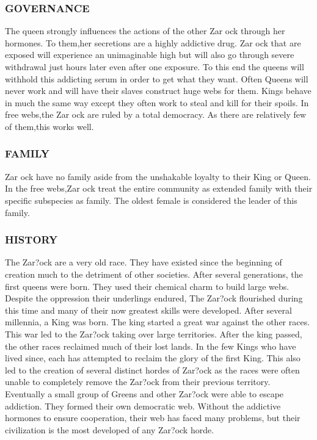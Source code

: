 \subsubsection{GOVERNANCE}
The queen strongly influences the actions of the other Zar ock through her
hormones.  To them,her secretions are a highly addictive drug.  Zar ock that
are exposed will experience an unimaginable high but will also go through
severe withdrawal just hours later even after one exposure.  To this end the
queens will withhold this addicting serum in order to get what they want.
Often Queens will never work and will have their slaves construct huge webs for
them.  Kings behave in much the same way except they often work to steal and
kill for their spoils.  In free webs,the Zar ock are ruled by a total
democracy.  As there are relatively few of them,this works well.
\subsubsection{FAMILY}
Zar ock have no family aside from the unshakable loyalty to their King or
Queen.  In the free webs,Zar ock treat the entire community as extended family
with their specific subspecies as family.  The oldest female is considered the
leader of this family.
\subsubsection{HISTORY}
The Zar?ock are a very old race.  They have existed since the beginning of
creation much to the detriment of other societies.  After several generations,
the first queens were born.  They used their chemical charm to build large
webs.  Despite the oppression their underlings endured, The Zar?ock flourished
during this time and many of their now greatest skills were developed.  After
several millennia, a King was born.  The king started a great war against the
other races.  This war led to the Zar?ock taking over large territories.  After
the king passed, the other races reclaimed much of their lost lands.  In the
few Kings who have lived since, each has attempted to reclaim the glory of the
first King.  This also led to the creation of several distinct hordes of
Zar?ock as the races were often unable to completely remove the Zar?ock from
their previous territory.  Eventually a small group of Greens and other Zar?ock
were able to escape addiction.  They formed their own democratic web.  Without
the addictive hormones to ensure cooperation, their web has faced many
problems, but their civilization is the most developed of any Zar?ock horde.
